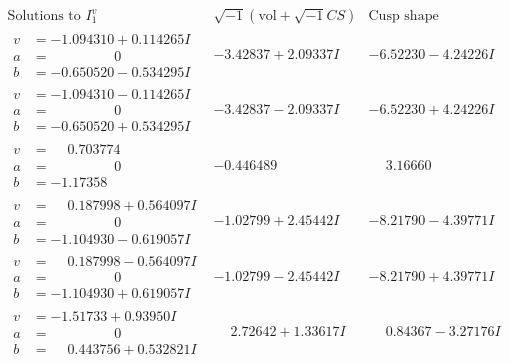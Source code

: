 \documentclass[1p]{elsarticle_modified}
\theoremstyle{definition}
\newcommand{\I}{\sqrt{-1}}
\begin{document}
$$\begin{array}{c|c|c}  
\text{Solutions to }I^v_{1}& \I (\text{vol} + \sqrt{-1}CS) & \text{Cusp shape}\\
 \hline 
\begin{aligned}
v &= -1.094310 + 0.114265 I \\
a &= \phantom{-0.000000 } 0 \\
b &= -0.650520 - 0.534295 I\end{aligned}
 & -3.42837 + 2.09337 I & -6.52230 - 4.24226 I \\ \hline\begin{aligned}
v &= -1.094310 - 0.114265 I \\
a &= \phantom{-0.000000 } 0 \\
b &= -0.650520 + 0.534295 I\end{aligned}
 & -3.42837 - 2.09337 I & -6.52230 + 4.24226 I \\ \hline\begin{aligned}
v &= \phantom{-}0.703774\phantom{ +0.000000I} \\
a &= \phantom{-0.000000 } 0 \\
b &= -1.17358\phantom{ +0.000000I}\end{aligned}
 & -0.446489\phantom{ +0.000000I} & \phantom{-}3.16660\phantom{ +0.000000I} \\ \hline\begin{aligned}
v &= \phantom{-}0.187998 + 0.564097 I \\
a &= \phantom{-0.000000 } 0 \\
b &= -1.104930 - 0.619057 I\end{aligned}
 & -1.02799 + 2.45442 I & -8.21790 - 4.39771 I \\ \hline\begin{aligned}
v &= \phantom{-}0.187998 - 0.564097 I \\
a &= \phantom{-0.000000 } 0 \\
b &= -1.104930 + 0.619057 I\end{aligned}
 & -1.02799 - 2.45442 I & -8.21790 + 4.39771 I \\ \hline\begin{aligned}
v &= -1.51733 + 0.93950 I \\
a &= \phantom{-0.000000 } 0 \\
b &= \phantom{-}0.443756 + 0.532821 I\end{aligned}
 & \phantom{-}2.72642 + 1.33617 I & \phantom{-}0.84367 - 3.27176 I \\ \hline\begin{aligned}

\end{aligned}
\end{array}$$
\end{document}
